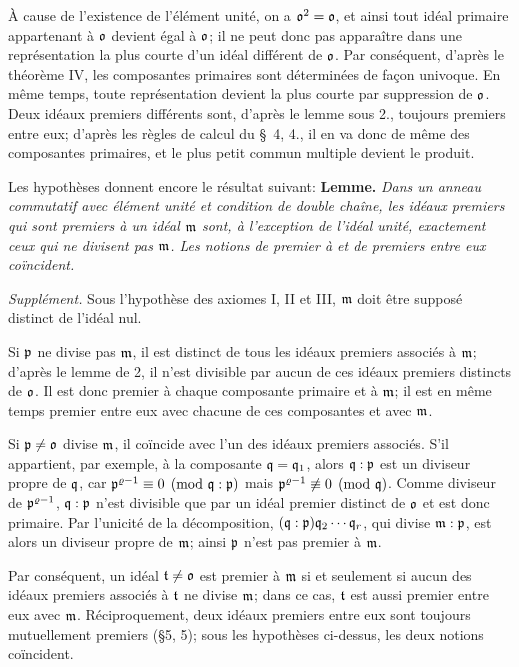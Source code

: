 À cause de l'existence de l'élément unité, on a $\mathfrak{o}^2=\mathfrak{o}$, et ainsi tout idéal primaire appartenant à $\mathfrak{o}$ devient égal à $\mathfrak{o}$; il ne peut donc pas apparaître dans une représentation la plus courte d'un idéal différent de $\mathfrak{o}$. Par conséquent, d'après le théorème IV, les composantes primaires sont déterminées de façon univoque. En même temps, toute représentation devient la plus courte par suppression de $\mathfrak{o}$. Deux idéaux premiers différents sont, d'après le lemme sous 2., toujours premiers entre eux; d'après les règles de calcul du §~4, 4., il en va donc de même des composantes primaires, et le plus petit commun multiple devient le produit.

Les hypothèses donnent encore le résultat suivant: \textbf{Lemme.} \emph{Dans un anneau commutatif avec élément unité et condition de double chaîne, les idéaux premiers qui sont premiers à un idéal $\mathfrak{m}$ sont, à l'exception de l'idéal unité, exactement ceux qui ne divisent pas $\mathfrak{m}$. Les notions de premier à et de premiers entre eux coïncident.}

\emph{Supplément.} Sous l'hypothèse des axiomes I, II et III, $\mathfrak{m}$ doit être supposé distinct de l'idéal nul.

Si $\mathfrak{p}$ ne divise pas $\mathfrak{m}$, il est distinct de tous les idéaux premiers associés à $\mathfrak{m}$; d'après le lemme de 2, il n'est divisible par aucun de ces idéaux premiers distincts de $\mathfrak{o}$. Il est donc premier à chaque composante primaire et à $\mathfrak{m}$; il est en même temps premier entre eux avec chacune de ces composantes et avec $\mathfrak{m}$.

Si $\mathfrak{p}\ne\mathfrak{o}$ divise $\mathfrak{m}$, il coïncide avec l'un des idéaux premiers associés. S'il appartient, par exemple, à la composante $\mathfrak{q}=\mathfrak{q}_1$, alors $\mathfrak{q}:\mathfrak{p}$ est un diviseur propre de $\mathfrak{q}$, car
$\mathfrak{p}^{\varrho-1}\equiv0\pmod{\mathfrak{q}:\mathfrak{p}}$ mais
$\mathfrak{p}^{\varrho-1}\not\equiv0\pmod{\mathfrak{q}}$. Comme diviseur de
$\mathfrak{p}^{\varrho-1}$, $\mathfrak{q}:\mathfrak{p}$ n'est divisible que par un idéal premier distinct de $\mathfrak{o}$ et est donc primaire. Par l'unicité de la décomposition,
$(\mathfrak{q}:\mathfrak{p})\mathfrak{q}_2\cdots\mathfrak{q}_r$, qui divise $\mathfrak{m}:\mathfrak{p}$, est alors un diviseur propre de $\mathfrak{m}$; ainsi $\mathfrak{p}$ n'est pas premier à $\mathfrak{m}$.

Par conséquent, un idéal $\mathfrak{t}\ne\mathfrak{o}$ est premier à $\mathfrak{m}$ si et seulement si aucun des idéaux premiers associés à $\mathfrak{t}$ ne divise $\mathfrak{m}$; dans ce cas, $\mathfrak{t}$ est aussi premier entre eux avec $\mathfrak{m}$. Réciproquement, deux idéaux premiers entre eux sont toujours mutuellement premiers (\S{}5, 5); sous les hypothèses ci-dessus, les deux notions coïncident.
